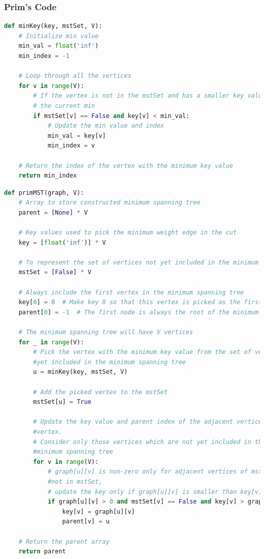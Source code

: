 \documentclass[a4paper, 10pt, twocolumn]{article}
\begin{document}
\subsubsection{Prim's Code}
\begin{lstlisting}[language=Python, caption={Python code to find minimum key}]
def minKey(key, mstSet, V):
    # Initialize min value
    min_val = float('inf')
    min_index = -1

    # Loop through all the vertices
    for v in range(V):
        # If the vertex is not in the mstSet and has a smaller key value than 
        # the current min
        if mstSet[v] == False and key[v] < min_val:
            # Update the min value and index
            min_val = key[v]
            min_index = v

    # Return the index of the vertex with the minimum key value
    return min_index


\end{lstlisting}
\begin{lstlisting}[language=Python, caption={Python code for Naive Prim's}]
def primMST(graph, V):
    # Array to store constructed minimum spanning tree
    parent = [None] * V

    # Key values used to pick the minimum weight edge in the cut
    key = [float('inf')] * V

    # To represent the set of vertices not yet included in the minimum spanning tree
    mstSet = [False] * V

    # Always include the first vertex in the minimum spanning tree
    key[0] = 0  # Make key 0 so that this vertex is picked as the first vertex
    parent[0] = -1  # The first node is always the root of the minimum spanning tree

    # The minimum spanning tree will have V vertices
    for _ in range(V):
        # Pick the vertex with the minimum key value from the set of vertices not 
        #yet included in the minimum spanning tree
        u = minKey(key, mstSet, V)

        # Add the picked vertex to the mstSet
        mstSet[u] = True

        # Update the key value and parent index of the adjacent vertices of the picked 
        #vertex.
        # Consider only those vertices which are not yet included in the 
        #minimum spanning tree
        for v in range(V):
            # graph[u][v] is non-zero only for adjacent vertices of mstSet[u] is 
            #not in mstSet,
            # update the key only if graph[u][v] is smaller than key[v]
            if graph[u][v] > 0 and mstSet[v] == False and key[v] > graph[u][v]:
                key[v] = graph[u][v]
                parent[v] = u

    # Return the parent array
    return parent
\end{lstlisting}
\end{document}
